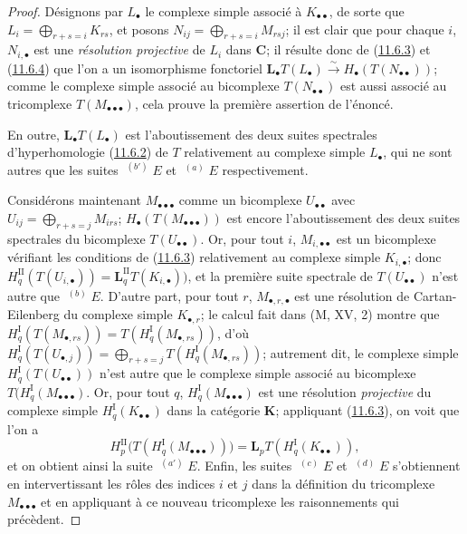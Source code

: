 \begin{proof}
Désignons par $L_\bullet$ le complexe simple associé à
$K_{\bullet\bullet}$, de sorte que $L_i=\bigoplus_{r+s=i}K_{rs}$, et
posons
$N_{ij}=\bigoplus_{r+s=i}M_{rsj}$;
il est clair que pour chaque $i$, $N_{i,\bullet}$ est une \emph{résolution
projective} de $L_i$ dans $\boldsymbol{C}$; il résulte donc de
(\hyperref[0.11.6.3-fr]{11.6.3}) et
(\hyperref[0.11.6.4-fr]{11.6.4}) que l'on a un isomorphisme fonctoriel
$
\mathbf{L}_\bullet T(L_\bullet)\xrightarrow{\sim} H_\bullet(T(N_{\bullet\bullet}))$;
comme le complexe simple associé au bicomplexe $T(N_{\bullet\bullet})$ est
aussi associé au tricomplexe $T(M_{\bullet\bullet\bullet})$, cela prouve la
première assertion de l'énoncé.

En outre, $\mathbf{L}_\bullet T(L_\bullet)$ est l'aboutissement des deux suites
spectrales d'hyperhomologie (\hyperref[0.11.6.2-fr]{11.6.2}) de $T$
relativement au complexe simple $L_\bullet$, qui ne sont autres que les suites
$\mathop{}^{(b')}E$ et $\mathop{}^{(a)}E$ respectivement.

Considérons maintenant $M_{\bullet\bullet\bullet}$ comme un bicomplexe
$U_{\bullet\bullet}$ avec
$U_{ij}=\bigoplus_{r+s=j}M_{irs}$;
$H_\bullet(T(M_{\bullet\bullet\bullet}))$ est encore l'aboutissement des deux
suites spectrales du bicomplexe $T(U_{\bullet\bullet})$. Or, pour tout $i$,
$M_{i,\bullet\bullet}$ est un bicomplexe vérifiant les conditions de
(\hyperref[0.11.6.3-fr]{11.6.3}) relativement au complexe simple
$K_{i,\bullet}$; donc
$H_q^{\mathrm{II}}(T(U_{i,\bullet}))=
\mathbf{L}_q^{\mathrm{II}}T(K_{i,\bullet}))$, et la première suite spectrale de
$T(U_{\bullet\bullet})$ n'est autre que $\mathop{}^{(b)}E$. D'autre part, pour
tout $r$, $M_{\bullet,r,\bullet}$ est une résolution de Cartan-Eilenberg du
complexe simple $K_{\bullet,r}$; le calcul fait dans (M, XV, 2) montre que
$H_q^{\mathrm I}(T(M_{\bullet,rs}))=T(H_q^{\mathrm I}(M_{\bullet,rs}))$,
d'où $H_q^{\mathrm I}(T(U_{\bullet,j}))=\bigoplus_{r+s=j}T(H_q^{\mathrm I}(M_{\bullet,rs}))$;
autrement dit, le complexe simple
$H_q^{\mathrm I}(T(U_{\bullet\bullet}))$ n'est autre que le complexe simple
associé au bicomplexe
$T(H_q^{\mathrm I}(M_{\bullet\bullet\bullet})$. Or, pour tout $q$,
$H_q^{\mathrm I}(M_{\bullet\bullet\bullet})$ est une résolution \emph{projective} du
complexe simple $H_q^{\mathrm I}(K_{\bullet\bullet})$ dans la catégorie
$\boldsymbol{K}$; appliquant (\hyperref[0.11.6.3-fr]{11.6.3}), on voit que l'on a
\[
H_p^{\mathrm{II}}
\bigl(T(H_q^{\mathrm I}(M_{\bullet\bullet\bullet}))\bigr)
=\mathbf{L}_pT(H_q^{\mathrm I}(K_{\bullet\bullet})),
\]
et on obtient ainsi la suite $\mathop{}^{(a')}E$. Enfin, les suites
$\mathop{}^{(c)}E$ et $\mathop{}^{(d)}E$ s'obtiennent en intervertissant les
rôles des indices $i$ et $j$ dans la définition du tricomplexe
$M_{\bullet\bullet\bullet}$ et en appliquant à ce nouveau tricomplexe les
raisonnements qui précèdent.
\end{proof}


